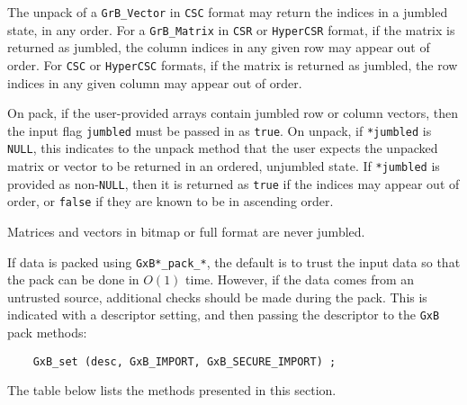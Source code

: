 \documentclass[12pt]{article}
\begin{document}
The unpack of a \verb'GrB_Vector' in \verb'CSC' format may return the
indices in a jumbled state, in any order.
For a \verb'GrB_Matrix' in \verb'CSR' or \verb'HyperCSR' format, if the matrix
is returned as jumbled, the column indices in any given row may appear out of
order.  For \verb'CSC' or \verb'HyperCSC' formats, if the matrix is returned as
jumbled, the row indices in any given column may appear out of order.

On pack, if the user-provided arrays contain jumbled row or column vectors,
then the input flag \verb'jumbled' must be passed in as \verb'true'.  On
unpack, if \verb'*jumbled' is \verb'NULL', this indicates to the unpack method
that the user expects the unpacked matrix or vector to be returned in an
ordered, unjumbled state.  If \verb'*jumbled' is provided as non-\verb'NULL',
then it is returned as \verb'true' if the indices may appear out of order, or
\verb'false' if they are known to be in ascending order.

Matrices and vectors in bitmap or full format are never jumbled.

If data is packed using
\verb'GxB*_pack_*', the default is to trust the input data so that the
pack can be done in $O(1)$ time.  However, if the data comes from an
untrusted source, additional checks should be made during the pack.  This is
indicated with a descriptor setting, and then passing the descriptor
to the \verb'GxB' pack methods:

    {\footnotesize
    \begin{verbatim}
    GxB_set (desc, GxB_IMPORT, GxB_SECURE_IMPORT) ; \end{verbatim}}

The table below lists the methods presented in this section.
\end{document}
